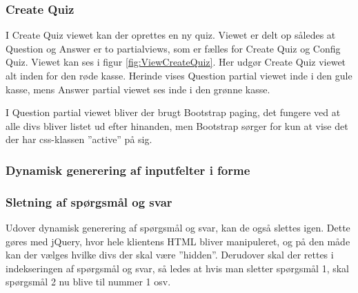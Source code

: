 \subsubsection{Create Quiz}
I Create Quiz viewet kan der oprettes en ny quiz. Viewet er delt op således at Question og Answer er to partialviews, som er fælles for Create Quiz og Config Quiz. Viewet kan ses i figur \ref{fig:ViewCreateQuiz}. Her udgør Create Quiz viewet alt inden for den røde kasse. Herinde vises Question partial viewet inde i den gule kasse, mens Answer partial viewet ses inde i den grønne kasse.


I Question partial viewet bliver der brugt Bootstrap paging, det fungere ved at alle divs bliver listet ud efter hinanden, men Bootstrap sørger for kun at vise det der har css-klassen ''active'' på sig.

\subsubsection*{Dynamisk generering af inputfelter i forme}

\subsubsection*{Sletning af spørgsmål og svar}
Udover dynamisk generering af spørgsmål og svar, kan de også slettes igen. Dette gøres med jQuery, hvor hele klientens HTML bliver manipuleret, og på den måde kan der vælges hvilke divs der skal være ''hidden''. Derudover skal der rettes i indekseringen af spørgsmål og svar, så ledes at hvis man sletter spørgsmål 1, skal spørgsmål 2 nu blive til nummer 1 osv.